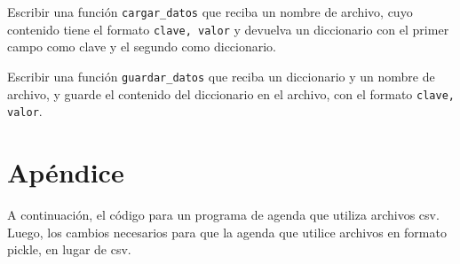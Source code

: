 \begin{partes}
  \item Escribir una función \lstinline!cargar_datos! que reciba un nombre de
archivo, cuyo contenido tiene el formato \lstinline!clave, valor! y devuelva un
diccionario con el primer campo como clave y el segundo como diccionario.
  \item Escribir una función \lstinline!guardar_datos! que reciba un diccionario
y un nombre de archivo, y guarde el contenido del diccionario en el archivo,
con el formato \lstinline!clave, valor!.
\end{partes}


\newpage
\section{Apéndice}

A continuación, el código para un programa de agenda que utiliza archivos
csv. Luego, los cambios necesarios para que la agenda que utilice archivos
en formato pickle, en lugar de csv.





